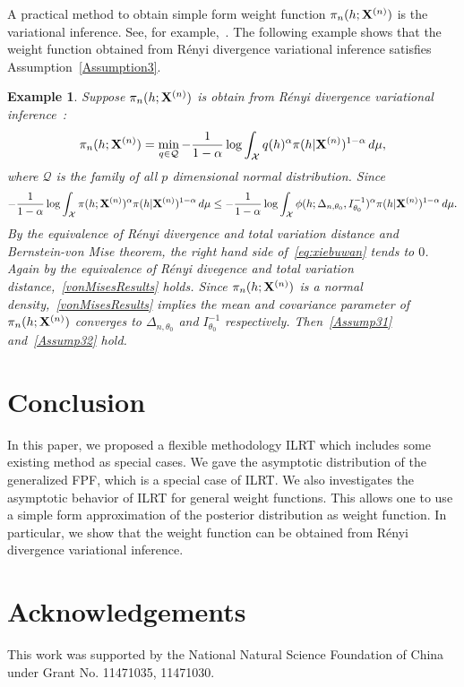 \documentclass[3p]{elsarticle}
\theoremstyle{plain}
\newtheorem{example}{Example}
\theoremstyle{definition}
\theoremstyle{remark}
\begin{document}
A practical method to obtain simple form weight function $\pi_n(h;\mathbf{X}^{(n)})$ is the variational inference. See, for example,~\cite{blei2017}.
The following example shows that the weight function obtained from R\'{e}nyi divergence variational inference satisfies Assumption~\ref{Assumption3}.

\begin{example}
    Suppose $\pi_n(h;\mathbf{X}^{(n)})$ is obtain from R\'{e}nyi divergence variational inference~\citep{NIPS2016_6208}:
    $$
        \pi_n(h;\mathbf{X}^{(n)})=\min_{q\in\mathcal{Q}} -\frac{1}{1-\alpha} \log \int_{\mathcal X} q(h)^{\alpha} \pi(h|\mathbf{X}^{(n)})^{1-\alpha}\, d\mu,
    $$
    where $\mathcal{Q}$ is the family of all $p$ dimensional normal distribution.
    Since
    \begin{equation}\label{eq:xiebuwan}
    -\frac{1}{1-\alpha} \log \int_{\mathcal X} \pi(h;\mathbf{X}^{(n)})^{\alpha} \pi(h|\mathbf{X}^{(n)})^{1-\alpha}\, d\mu
    \leq
    -\frac{1}{1-\alpha} \log \int_{\mathcal X} \phi(h;\Delta_{n,\theta_0}, I_{\theta_0}^{-1})^{\alpha} \pi(h|\mathbf{X}^{(n)})^{1-\alpha}\, d\mu.
    \end{equation}
    By the equivalence of R\'{e}nyi divergence and total variation distance and Bernstein-von Mise theorem, the right hand side of~\eqref{eq:xiebuwan} tends to $0$.
    Again by the equivalence of R\'{e}nyi divegence and total variation distance,~\eqref{vonMisesResults} holds.
    Since $\pi_n(h;\mathbf{X}^{(n)})$ is a normal density,~\eqref{vonMisesResults} implies the mean and covariance parameter of $\pi_n(h;\mathbf{X}^{(n)})$ converges to $\Delta_{n,\theta_0}$ and $I_{\theta_0}^{-1}$ respectively. Then~\eqref{Assump31} and~\eqref{Assump32} hold.
\end{example}


\section{Conclusion}
In this paper, we proposed a flexible methodology ILRT which includes some existing method as special cases.
We gave the asymptotic distribution of the generalized FPF, which is a special case of ILRT.
We also investigates the asymptotic behavior of ILRT for general weight functions.
This allows one to use a simple form approximation of the posterior distribution as weight function.
In particular, we show that the weight function can be obtained from R\'{e}nyi divergence variational inference.

\section*{Acknowledgements}
This work was supported by the National Natural Science Foundation of China under Grant No. 11471035, 11471030.
\end{document}

